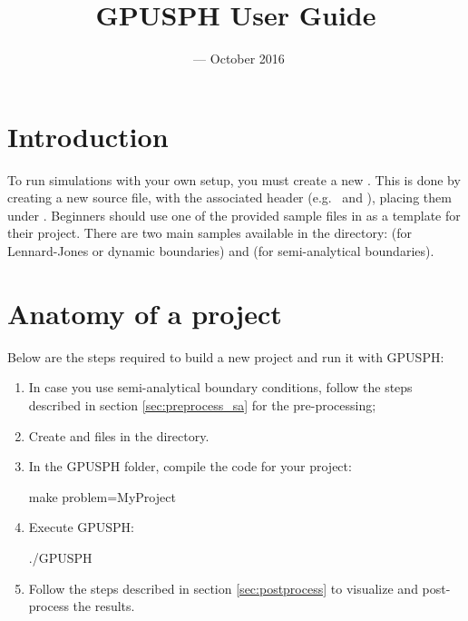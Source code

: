 \documentclass{../GPUSPHtemplate}
\title{GPUSPH User Guide}
\author{}
\date{\currentver\ --- October 2016}
\begin{document}
\maketitle
\tableofcontents
\newpage
\section{Introduction}

To run simulations with your own setup, you must create a new
. This is done by creating a new \cu source file, with
the associated header (e.g.\  and ),
placing them under . 
Beginners should use one of the provided sample files in  
as a template for their project.
There are two main samples available in the  directory: 
 (for Lennard-Jones or dynamic boundaries) 
and  (for semi-analytical boundaries).\\

%
%

\section{Anatomy of a project}

Below are the steps required to build a new project and run it with GPUSPH:
\begin{enumerate}
\item In case you use semi-analytical boundary conditions, follow the steps 
described in section \ref{sec:preprocess_sa} for the pre-processing;
\item Create  and  files in 
the  directory.
\item In the GPUSPH folder, compile the code for your project:
\begin{shellcode}
make problem=MyProject
\end{shellcode}
\item Execute GPUSPH:
\begin{shellcode}
./GPUSPH
\end{shellcode}
\item Follow the steps described in section \ref{sec:postprocess} 
to visualize and post-process the results.
\end{enumerate}
\end{document}
